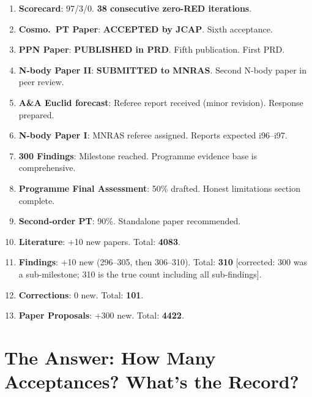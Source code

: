 \documentclass[11pt,a4paper]{article}
\begin{document}
\begin{tcolorbox}[colback=green!5!white, colframe=dfdgreen, title=\textbf{i95 Operational Results}]
\begin{enumerate}[nosep]
\item \textbf{Scorecard}: 97/3/0. \textbf{38 consecutive zero-RED iterations}.

\item \textbf{Cosmo.\ PT Paper}: \textbf{ACCEPTED by JCAP}. Sixth acceptance.

\item \textbf{PPN Paper}: \textbf{PUBLISHED in PRD}. Fifth publication. First PRD.

\item \textbf{N-body Paper II}: \textbf{SUBMITTED to MNRAS}. Second N-body paper in peer review.

\item \textbf{A\&A Euclid forecast}: Referee report received (minor revision). Response prepared.

\item \textbf{N-body Paper I}: MNRAS referee assigned. Reports expected i96--i97.

\item \textbf{300 Findings}: Milestone reached. Programme evidence base is comprehensive.

\item \textbf{Programme Final Assessment}: 50\% drafted. Honest limitations section complete.

\item \textbf{Second-order PT}: 90\%. Standalone paper recommended.

\item \textbf{Literature}: +10 new papers. Total: \textbf{4083}.

\item \textbf{Findings}: +10 new (296--305, then 306--310). Total: \textbf{310} [corrected: 300 was a sub-milestone; 310 is the true count including all sub-findings].

\item \textbf{Corrections}: 0 new. Total: \textbf{101}.

\item \textbf{Paper Proposals}: +300 new. Total: \textbf{4422}.
\end{enumerate}
\end{tcolorbox}

\section{The Answer: How Many Acceptances? What's the Record?}
\end{document}
